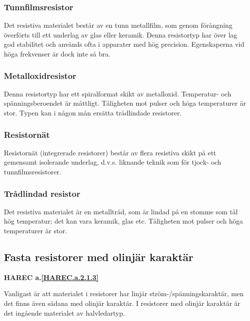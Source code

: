 \subsubsection{Tunnfilmsresistor}

Det resistiva materialet består av en tunn metallfilm, som genom förångning
överförts till ett underlag av glas eller keramik. Denna resistortyp har över
lag god stabilitet och används ofta i apparater med hög precision. Egenskaperna
vid höga frekvenser är dock inte så bra.

\subsubsection{Metalloxidresistor}

Denna resistortyp har ett spiralformat skikt av metalloxid. Temperatur- och
spänningsberoendet är måttligt. Tåligheten mot pulser och höga temperaturer är
stor. Typen kan i någon mån ersätta trådlindade resistorer.

\subsubsection{Resistornät}

Resistornät (integrerade resistorer) består av flera resistiva skikt på ett
gemensamt isolerande underlag, d.v.s. liknande teknik som för tjock- och
tunnfilmsresistorer.

\subsubsection{Trådlindad resistor}

Det resistiva materialet är en metalltråd, som är lindad på en stomme som tål
hög temperatur; det kan vara keramik, glas etc.
Tåligheten mot pulser och höga temperaturer är stor.

\subsection{Fasta resistorer med olinjär karaktär}
\textbf{HAREC a.\ref{HAREC.a.2.1.3}\label{myHAREC.a.2.1.3}}

Vanligast är att materialet i resistorer har linjär ström-/spänningskaraktär,
men det finns även sådana med olinjär karaktär. I resistorer med olinjär
karaktär är det ingående materialet av halvledartyp.

